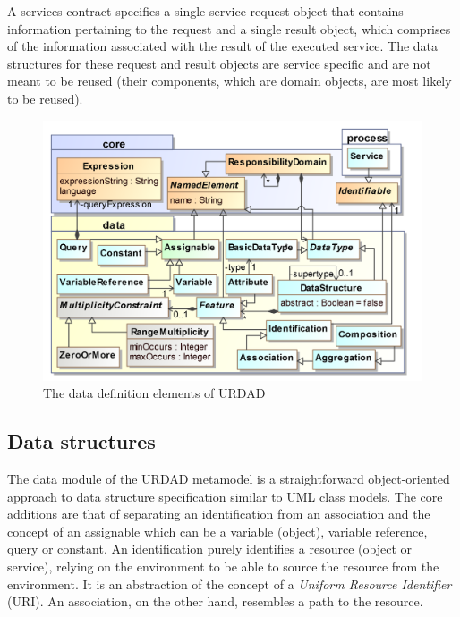 A services contract specifies a single service request object that contains information pertaining to the request and a single result object, which comprises of the information associated with the result of the executed service. The data structures for these request and result objects are service specific and are not meant to be reused (their components, which are domain objects, are most likely to be reused).


\begin{figure}[Htbp]
  \centering
  \includegraphics{data}
  \caption{The data definition elements of URDAD}
  \label{fig:metamodel}
\end{figure}

\subsection{Data structures}

The data module of the URDAD metamodel is a straightforward object-oriented approach to data structure specification similar to UML class models. The core additions are that of separating an identification from an association and the concept of an assignable which can be a variable (object), variable reference, query or constant. An identification purely identifies a resource (object or service), relying on the environment to be able to source the resource from the environment. It is an abstraction of the concept of a \emph{Uniform Resource Identifier} (URI). An association, on the other hand, resembles a path to the resource.

